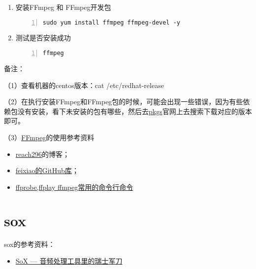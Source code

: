 \begin{enumerate}
\item 安装FFmpeg 和 FFmpeg开发包
\begin{lstlisting}[language = shell, numbers=left, 
         numberstyle=\tiny,keywordstyle=\color{blue!70},
         commentstyle=\color{red!50!green!50!blue!50},frame=shadowbox,
         rulesepcolor=\color{red!20!green!20!blue!20},basicstyle=\ttfamily]
sudo yum install ffmpeg ffmpeg-devel -y
\end{lstlisting}
\item 测试是否安装成功
\begin{lstlisting}[language = shell, numbers=left, 
         numberstyle=\tiny,keywordstyle=\color{blue!70},
         commentstyle=\color{red!50!green!50!blue!50},frame=shadowbox,
         rulesepcolor=\color{red!20!green!20!blue!20},basicstyle=\ttfamily]
ffmpeg
\end{lstlisting}
\end{enumerate}

备注：

（1）查看机器的centos版本：cat /etc/redhat-release

（2）在执行安装FFmpeg和FFmpeg包的时候，可能会出现一些错误，因为有些依赖包没有安装，看下未安装的包有哪些，然后去\href{https://pkgs.org}{pkgs}官网上去搜索下载对应的版本即可。

（3）\href{http://ffmpeg.org/}{FFmpeg}的使用参考资料
	\begin{itemize}
		\item \href{https://www.cnblogs.com/reach296/p/4002020.html}{reach296}的博客；
		\item \href{https://github.com/feixiao/ffmpeg}{feixiao的GitHub库}；
		\item \href{https://juejin.im/post/5a59993cf265da3e4f0a1e4b}{ffprobe,ffplay ffmpeg常用的命令行命令}
	\end{itemize}

\section{sox}
sox的参考资料：
\begin{itemize}
	\item \href{https://rollingstarky.github.io/2018/12/18/processing-audio-with-sox/}{SoX — 音频处理工具里的瑞士军刀}
\end{itemize}

